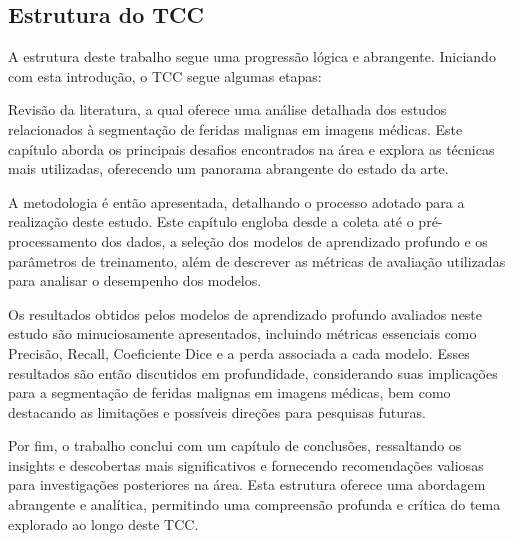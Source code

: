 \subsection{Estrutura do TCC}

A estrutura deste trabalho segue uma progressão lógica e abrangente. Iniciando com esta introdução, o TCC segue algumas etapas:

Revisão da literatura, a qual oferece uma análise detalhada dos estudos relacionados à segmentação de feridas malignas em imagens médicas. Este capítulo aborda os principais desafios encontrados na área e explora as técnicas mais utilizadas, oferecendo um panorama abrangente do estado da arte.

A metodologia é então apresentada, detalhando o processo adotado para a realização deste estudo. Este capítulo engloba desde a coleta até o pré-processamento dos dados, a seleção dos modelos de aprendizado profundo e os parâmetros de treinamento, além de descrever as métricas de avaliação utilizadas para analisar o desempenho dos modelos.

Os resultados obtidos pelos modelos de aprendizado profundo avaliados neste estudo são minuciosamente apresentados, incluindo métricas essenciais como Precisão, Recall, Coeficiente Dice e a perda associada a cada modelo. Esses resultados são então discutidos em profundidade, considerando suas implicações para a segmentação de feridas malignas em imagens médicas, bem como destacando as limitações e possíveis direções para pesquisas futuras.

Por fim, o trabalho conclui com um capítulo de conclusões, ressaltando os insights e descobertas mais significativos e fornecendo recomendações valiosas para investigações posteriores na área. Esta estrutura oferece uma abordagem abrangente e analítica, permitindo uma compreensão profunda e crítica do tema explorado ao longo deste TCC.